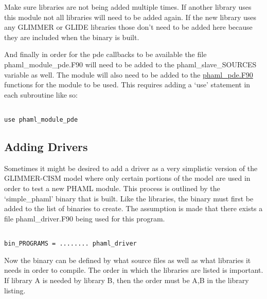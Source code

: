 Make sure libraries are not being added multiple times.  If another library uses this module not all libraries will need to be added again.  If the new library uses any GLIMMER or GLIDE libraries those don't need to be added here because they are included when the binary is built.


And finally in order for the pde callbacks to be available the file phaml\_module\_pde.F90 will need to be added to the phaml\_slave\_SOURCES variable as well.  The module will also need to be added to the \href{http://svn.berlios.de/svnroot/repos/glimmer-cism/glimmer-cism2/libphaml/phaml\_pde.F90}{phaml\_pde.F90}
 functions for the module to be used.  This requires adding a `use' statement in each subroutine like so: 

\begin{framecode}{6in}
\begin{verbatim}

use phaml_module_pde

\end{verbatim}
\end{framecode}

\subsection{Adding Drivers}\label{sec:adddrive}

Sometimes it might be desired to add a driver as a very simplistic version of the GLIMMER-CISM model where only certain portions of the model are used in order to test a new PHAML module.  This process is outlined by the `simple\_phaml' binary that is built.  Like the libraries, the binary must first be added to the list of binaries to create.  The assumption is made that there exists a file phaml\_driver.F90 being used for this program.

\begin{framecode}{6in}
\begin{verbatim}

bin_PROGRAMS = ........ phaml_driver

\end{verbatim}
\end{framecode}

Now the binary can be defined by what source files as well as what libraries it needs in order to compile.  The order in which the libraries are listed is important.  If library A is needed by library B, then the order must be A,B in the library listing.

